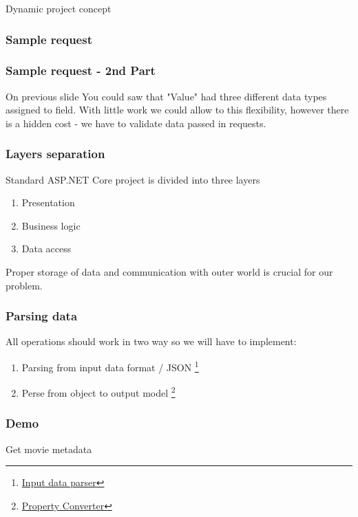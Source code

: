 \documentclass{beamer}
\begin{document}
\begin{section}{Dynamic project concept}
\begin{frame}
\frametitle{Sample request \footnotemark[1]}




\end{frame}

\begin{frame}
\frametitle{Sample request - 2nd Part }
On previous slide You could saw that "Value"  had three different data types assigned to field. With little work we could allow to this flexibility, however there is a hidden cost - we have to validate data passed in requests.

\end{frame}

\begin{frame}
\frametitle{Layers separation} 
Standard ASP.NET Core project is divided into three layers \pause
\begin{enumerate}
	\item Presentation \pause
	\item Business logic \pause
	\item Data access \pause
\end{enumerate}

Proper storage of data and communication with outer world is crucial for our problem.
\end{frame}

\begin{frame}
\frametitle{Parsing data}

All operations should work in two way so we will have to implement:
\begin{enumerate}
\item Parsing from input data format / JSON \footnote[1]{\href{https://github.com/paqaos/DynamicMetadata-SFI2021/blob/main/MovieDatabase/MovieDatabase/Services/MetadataObject/InputDataParser.cs}{Input data parser}}
\item Perse from object to output model \footnote[2]{\href{https://github.com/paqaos/DynamicMetadata-SFI2021/blob/main/MovieDatabase/MovieDatabase/Converters/PropertyConverter.cs}{Property Converter}}
\end{enumerate}
\end{frame}

\begin{frame}
\frametitle{Demo}
Get movie metadata
\end{frame}

\end{section}
\end{document}
